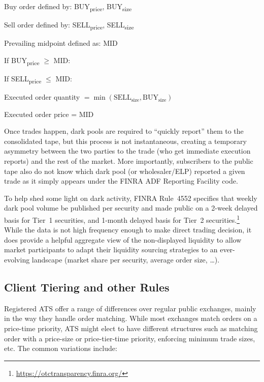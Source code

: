 \noindent Buy order defined by: BUY\textsubscript{price}, BUY\textsubscript{size} \par
\noindent Sell order defined by: SELL\textsubscript{price}, SELL\textsubscript{size}  \par
\noindent Prevailing midpoint defined as: MID \twomedskip

\noindent If BUY\textsubscript{price} $\geq$ MID: \par
\indent If SELL\textsubscript{price} $\leq$ MID: \par
\indent\indent Executed order quantity $= \min(\text{SELL}_{\text{size}}, \text{BUY}_{\text{size}})$ \par
\indent\indent Executed order price = MID \twomedskip


Once trades happen, dark pools are required to ``quickly report'' them to the consolidated tape, but this process is not instantaneous, creating a temporary asymmetry between the two parties to the trade (who get immediate execution reports) and the rest of the market. More importantly, subscribers to the public tape also do not know which dark pool (or wholesaler/ELP) reported a given trade as it simply appears under the FINRA ADF Reporting Facility code.


To help shed some light on dark activity, FINRA Rule~4552 specifies that weekly dark pool volume be published per security and made public on a 2-week delayed basis for Tier~1 securities, and 1-month delayed basis for Tier~2 securities.\footnote{\url{https://otctransparency.finra.org/}} While the data is not high frequency enough to make direct trading decision, it does provide a helpful aggregate view of the non-displayed liquidity to allow market participants to adapt their liquidity sourcing strategies to an ever-evolving landscape (market share per security, average order size, \dots).


\subsection{Client Tiering and other Rules\label{sec:client_tier}}

Registered ATS offer a range of differences over regular public exchanges, mainly in the way they handle order matching. While most exchanges match orders on a price-time priority, ATS might elect to have different structures such as matching order with a price-size or price-tier-time priority, enforcing minimum trade sizes, etc. The common variations include:



